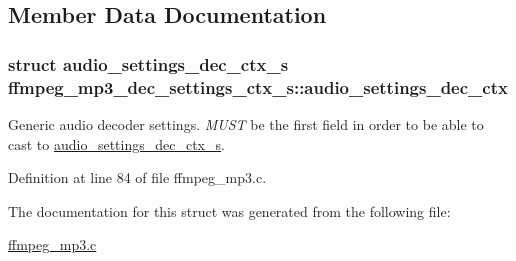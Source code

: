 \subsection{Member Data Documentation}
\subsubsection[{\texorpdfstring{audio\+\_\+settings\+\_\+dec\+\_\+ctx}{audio_settings_dec_ctx}}]{\setlength{\rightskip}{0pt plus 5cm}struct {\bf audio\+\_\+settings\+\_\+dec\+\_\+ctx\+\_\+s} ffmpeg\+\_\+mp3\+\_\+dec\+\_\+settings\+\_\+ctx\+\_\+s\+::audio\+\_\+settings\+\_\+dec\+\_\+ctx}\hypertarget{structffmpeg__mp3__dec__settings__ctx__s_a7d85d6a96ffe6563fe7f3083c389699f}{}\label{structffmpeg__mp3__dec__settings__ctx__s_a7d85d6a96ffe6563fe7f3083c389699f}
Generic audio decoder settings. {\itshape M\+U\+ST} be the first field in order to be able to cast to \hyperlink{structaudio__settings__dec__ctx__s}{audio\+\_\+settings\+\_\+dec\+\_\+ctx\+\_\+s}. 

Definition at line 84 of file ffmpeg\+\_\+mp3.\+c.



The documentation for this struct was generated from the following file\+:\begin{DoxyCompactItemize}
\item 
\hyperlink{ffmpeg__mp3_8c}{ffmpeg\+\_\+mp3.\+c}\end{DoxyCompactItemize}
